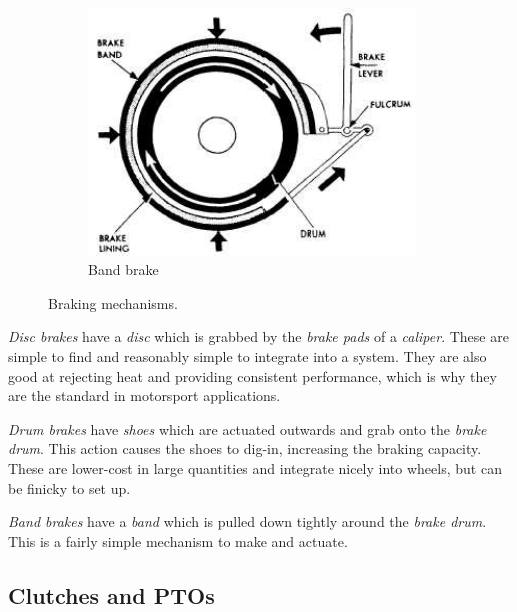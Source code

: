 \documentclass[10pt,letterpaper]{book}
\begin{document}
\begin{figure}[H]
\begin{subfigure}[b]{.32\linewidth}
		\includegraphics[width=0.95\textwidth]{imgs/brake_band.jpeg}
		\caption{Band brake}
	\end{subfigure}
	\caption{Braking mechanisms.}
\end{figure}

\begin{asparaenum}[a)]
	\item \textit{Disc brakes} have a \textit{disc} which is grabbed by the \textit{brake pads} of a \textit{caliper}. These are simple to find and reasonably simple to integrate into a system. They are also good at rejecting heat and providing consistent performance, which is why they are the standard in motorsport applications.
	\item \textit{Drum brakes} have \textit{shoes} which are actuated outwards and grab onto the \textit{brake drum}. This action causes the shoes to dig-in, increasing the braking capacity. These are lower-cost in large quantities and integrate nicely into wheels, but can be finicky to set up.
	\item \textit{Band brakes} have a \textit{band} which is pulled down tightly around the \textit{brake drum}. This is a fairly simple mechanism to make and actuate. 
\end{asparaenum}


\subsection{Clutches and PTOs}
\end{document}
